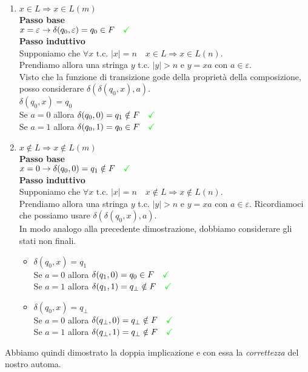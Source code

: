 \documentclass[a4paper,oneside]{scrbook}
\newcommand{\greenmark}{\quad \textcolor{green}{\checkmark}}
\begin{document}
\begin{enumerate}
	\item $x\in L \Rightarrow x \in L(m)$\\
	\textbf{Passo base}\\
	$ x=\varepsilon \rightarrow \delta(q_0,\varepsilon)=q_0 \in F \greenmark $\\
	\textbf{Passo induttivo}\\
	Supponiamo che $\forall x \text{ t.c. } |x|=n \quad x \in L \Rightarrow x\in L(n)$.\\
	Prendiamo allora una stringa $y$ t.c. $|y|>n$ e $y=xa \text{ con }a\in\varepsilon$.\\
	Visto che la funzione di transizione gode della proprietà della composizione, posso considerare $\delta(\delta(q_0,x),a)$.\\
	$\delta(q_0,x)=q_0$\\
	Se $a=0$ allora $\delta(q_0,0)=q_1 \notin F \greenmark$\\
	Se $a=1$ allora $\delta(q_0,1)=q_0 \in F \greenmark$
	
	\item $x\notin L \Rightarrow x \notin L(m)$\\
	\textbf{Passo base}\\
	$x=0 \rightarrow \delta(q_0,0)=q_1 \notin F \greenmark$\\
	\textbf{Passo induttivo}\\
	Supponiamo che $\forall x \text{ t.c. } |x|=n \quad x \notin L \Rightarrow x\notin L(n)$.\\
	Prendiamo allora una stringa $y$ t.c. $|y|>n$ e $y=xa \text{ con }a\in\varepsilon$. Ricordiamoci che possiamo usare $\delta(\delta(q_0,x),a)$.\\
	In modo analogo alla precedente dimostrazione, dobbiamo considerare gli stati non finali.
	\begin{itemize}
		\item $\delta(q_0,x)=q_1$\\
		Se $a=0$ allora $\delta(q_1,0)=q_0 \in F \greenmark$\\
		Se $a=1$ allora $\delta(q_1,1)=q_\bot \notin F \greenmark$
		\item $\delta(q_0,x)=q_\bot$\\
		Se $a=0$ allora $\delta(q_\bot,0)=q_\bot \notin F \greenmark$\\
		Se $a=1$ allora $\delta(q_\bot,1)=q_\bot \notin F \greenmark$
	\end{itemize}
\end{enumerate}
Abbiamo quindi dimostrato la doppia implicazione e con essa la \textit{correttezza} del nostro automa.
\end{document}
